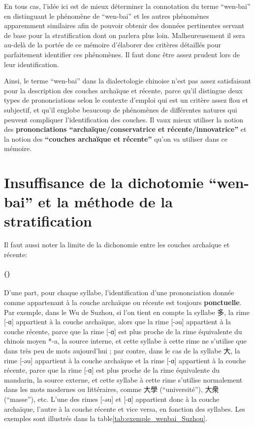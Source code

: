 \documentclass{scrbook}
\newcounter{c}[subsubsection]
\newcommand{\stpc}[1]{\stepcounter{#1}}
\newcommand{\difwenbai}{couches archaïque et récente\xspace}
\newcommand{\illustre}{Les exemples sont illustrés dans la table\xspace}
\begin{document}
\begin{sloppypar}
En tous cas, l'idée ici est de mieux déterminer la connotation du terme ``wen-bai'' en distinguant le phénomène de ``wen-bai'' et les autres phénomènes apparemment similaires afin de pouvoir  obtenir des données pertinentes servant de base pour la stratification dont on parlera plus loin. Malheureusement il sera au-delà de la portée de ce mémoire d'élaborer des critères détaillés pour parfaitement identifier ces phénomènes. Il faut donc être assez prudent lors de leur identification. %

Ainsi, le terme ``wen-bai'' dans la dialectologie chinoise n'est pas assez satisfaisant pour la description des \difwenbai, parce qu'il distingue deux types de prononciations selon le contexte d'emploi qui est un critère assez flou et subjectif, et qu'il englobe beaucoup de phénomènes de différentes natures qui peuvent compliquer l'identification des couches. Il vaux mieux utiliser la notion des \textbf{prononciations ``archaïque/conservatrice et récente/innovatrice''} et la notion des \textbf{``\difwenbai ''} qu'on va utiliser dans ce mémoire. 

\section{Insuffisance de la dichotomie ``wen-bai'' et la méthode de la stratification}
Il faut aussi noter la limite de la dichonomie entre les \difwenbai : 

\stpc{c}\paragraph{()}
D'une part, pour chaque syllabe, l'identification d'une prononciation donnée comme appartenant à la couche archaïque ou récente est toujours \textbf{ponctuelle}. Par exemple, dans le Wu de Suzhou, si l'on tient en compte la syllabe 多, la rime [-ɑ] appartient à la couche archaïque, alors que la rime [-əu] appartient à la couche récente, parce que la rime [-ɑ] est plus proche de la rime équivalente du chinois moyen *-a, la source interne, et cette syllabe à cette rime ne s'utilise que dans très peu de mots aujourd'hui ; par contre, dans le cas de la syllabe 大, la rime [-əu] appartient à la couche archaïque et la rime [-ɑ] appartient à la couche récente, parce que la rime [-ɑ] est plus proche de la rime équivalente du mandarin, la source externe, et cette syllabe à cette rime s'utilise normalement dans les mots modernes ou littéraires, comme 大學 (``université''), 大衆 (``masse''), etc. L'une des rimes [-əu] et [-ɑ] appartient donc à la couche archaïque, l'autre à la couche récente et vice versa, en fonction des syllabes. \illustre \ref{tab:exemple_wenbai_Suzhou}.\label{sec:exemple_duo_da_suzhou}


\end{sloppypar}
\end{document}
